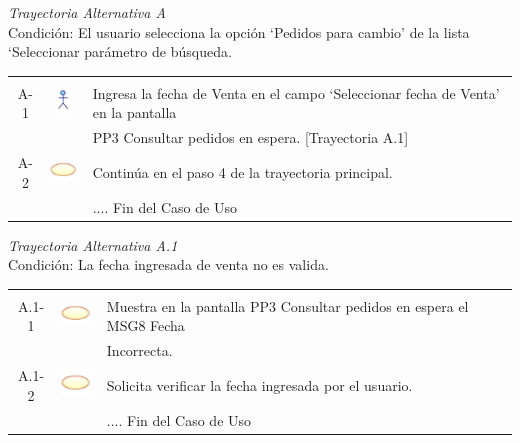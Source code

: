 \documentclass[10pt,spanish]{article}
\providecommand{\tabularnewline}{\\}
\begin{document}
	\textit{Trayectoria Alternativa A}\\
	Condición: El usuario selecciona la opción ‘Pedidos para cambio’ de la lista ‘Seleccionar parámetro de búsqueda.\\
	\begin{tabular}{ccl}
	& & \tabularnewline
	A-1 & \includegraphics{actor} & Ingresa la fecha de Venta en el campo ‘Seleccionar fecha de Venta’ en la pantalla\tabularnewline
	& & PP3 Consultar pedidos en espera. [Trayectoria A.1] \tabularnewline
	A-2 & \includegraphics{sistema} & Continúa en el paso 4 de la trayectoria principal.\tabularnewline	
	 & & .... Fin del Caso de Uso\tabularnewline
	\end{tabular}

	\textit{Trayectoria Alternativa A.1}\\
	Condición: La fecha ingresada de venta no es valida.\\
	\begin{tabular}{ccl}
	& & \tabularnewline
	A.1-1 & \includegraphics{sistema} & Muestra en la pantalla PP3 Consultar pedidos en espera el MSG8 Fecha\tabularnewline
	& & Incorrecta.\tabularnewline 
	A.1-2 & \includegraphics{sistema} & Solicita verificar la fecha ingresada por el usuario.\tabularnewline	
	 & & .... Fin del Caso de Uso\tabularnewline
	\end{tabular}
\end{document}
